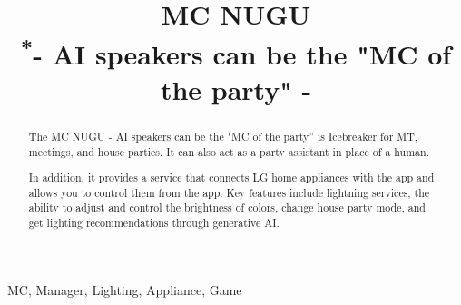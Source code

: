 \documentclass[conference]{IEEEtran}
\begin{document}
\title{MC NUGU\\
    {\footnotesize \textsuperscript{*}- AI speakers can be the "MC of the party" -}
    }

\author{
\and
{}
\and
{}
}

\maketitle

\begin{abstract}
The MC NUGU - AI speakers can be the "MC of the party” is Icebreaker for MT, meetings, and house parties. It can also act as a party assistant in place of a human.

In addition, it provides a service that connects LG home appliances with the app and allows you to control them from the app. Key features include lightning services, the ability to adjust and control the brightness of colors, change house party mode, and get lighting recommendations through generative AI.
\end{abstract}

\begin{IEEEkeywords}
MC, Manager, Lighting, Appliance, Game
\end{IEEEkeywords}
\end{document}
